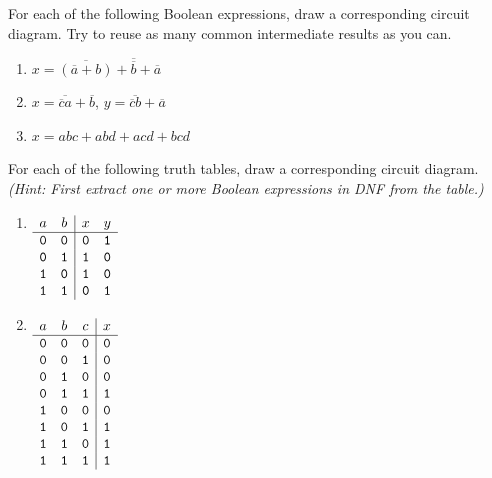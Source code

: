 \begin{exercises}
\problem For each of the following Boolean expressions, draw a corresponding circuit diagram. Try to reuse as many common intermediate results as you can.
\begin{enumerate}
\item $x=\overline{(\overline{a}+b)}+\overline{\overline{b}}+\overline{a}$
\item $x=\overline{\overline{c}a}+\overline{b}$, $y=\overline{\overline{c}b}+\overline{a}$
\item $x=abc+abd+acd+bcd$
\end{enumerate}

\problem For each of the following truth tables, draw a corresponding circuit diagram. \textit{(Hint: First extract one or more Boolean expressions in DNF from the table.)}
\begin{enumerate}
\item \( \begin{array}[t]{cc|cc}
a  & b  & x  & y\\ \hline
\mathtt{0} & \mathtt{0} & \mathtt{0} & \mathtt{1}\\
\mathtt{0} & \mathtt{1} & \mathtt{1} & \mathtt{0}\\
\mathtt{1} & \mathtt{0} & \mathtt{1} & \mathtt{0}\\
\mathtt{1} & \mathtt{1} & \mathtt{0} & \mathtt{1}
\end{array} \)
\item \( \begin{array}[t]{ccc|c}
a  & b  & c  & x\\ \hline
\mathtt{0} & \mathtt{0} & \mathtt{0} & \mathtt{0}\\
\mathtt{0} & \mathtt{0} & \mathtt{1} & \mathtt{0}\\
\mathtt{0} & \mathtt{1} & \mathtt{0} & \mathtt{0}\\
\mathtt{0} & \mathtt{1} & \mathtt{1} & \mathtt{1}\\
\mathtt{1} & \mathtt{0} & \mathtt{0} & \mathtt{0}\\
\mathtt{1} & \mathtt{0} & \mathtt{1} & \mathtt{1}\\
\mathtt{1} & \mathtt{1} & \mathtt{0} & \mathtt{1}\\
\mathtt{1} & \mathtt{1} & \mathtt{1} & \mathtt{1}
\end{array} \)
\end{enumerate}


\end{exercises}
